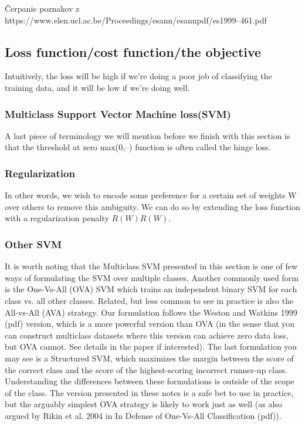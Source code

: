 \documentclass[10pt,a4paper]{article}
\begin{document}
Čerpanie poznakov z https://www.elen.ucl.ac.be/Proceedings/esann/esannpdf/es1999--461.pdf

\subsection{Loss function/cost function/the objective}
Intuitively, the loss will be high if we’re doing a poor job of classifying the training data, and it will be low if we’re doing well.

\subsubsection{Multiclass Support Vector Machine loss(SVM)}
A last piece of terminology we will mention before we finish with this section is that the threshold at zero max(0,--) function is often called the hinge loss.

\subsubsection{Regularization}
In other words, we wish to encode some preference for a certain set of weights W over others to remove this ambiguity. We can do so by extending the loss function with a regularization penalty $R(W)R(W)$.

\subsubsection{Other SVM}
It is worth noting that the Multiclass SVM presented in this section is one of few ways of formulating the SVM over multiple classes.
Another commonly used form is the One-Vs-All (OVA) SVM which trains an independent binary SVM for each class vs. all other classes.
Related, but less common to see in practice is also the All-vs-All (AVA) strategy.
Our formulation follows the Weston and Watkins 1999 (pdf) version, which is a more powerful version than OVA (in the sense that you can construct multiclass datasets where this version can achieve zero data loss, but OVA cannot.
See details in the paper if interested).
The last formulation you may see is a Structured SVM, which maximizes the margin between the score of the correct class and the score of the highest-scoring incorrect runner-up class.
Understanding the differences between these formulations is outside of the scope of the class.
The version presented in these notes is a safe bet to use in practice, but the arguably simplest OVA strategy is likely to work just as well (as also argued by Rikin et al. 2004 in In Defense of One-Vs-All Classification (pdf)).
\end{document}
